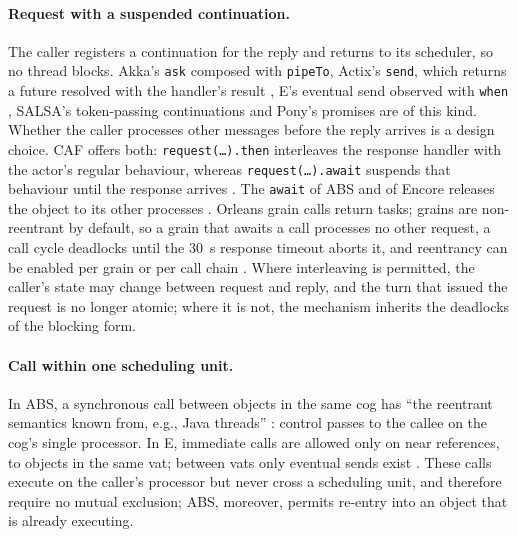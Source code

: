 \documentclass[11pt]{article}
\theoremstyle{definition}
\theoremstyle{remark}
\begin{document}
\paragraph{Request with a suspended continuation.} The caller registers a continuation for
the reply and returns to its scheduler, so no thread blocks. Akka's \texttt{ask} composed
with \texttt{pipeTo}, Actix's \texttt{send}, which returns a future resolved with the
handler's result \cite{actix}, E's eventual send observed with \texttt{when}
\cite{miller2005}, SALSA's token-passing continuations \cite{varela2001salsa} and Pony's
promises \cite{clebsch2015pony} are of this kind. Whether the caller processes other
messages before the reply arrives is a design choice. CAF offers both:
\texttt{request(\ldots).then} interleaves the response handler with the actor's regular
behaviour, whereas \texttt{request(\ldots).await} suspends that behaviour until the
response arrives \cite{charousset2016caf}. The \texttt{await} of ABS and of Encore
releases the object to its other processes \cite{johnsen2012abs,brandauer2015encore}.
Orleans grain calls return tasks; grains are non-reentrant by default, so a grain that
awaits a call processes no other request, a call cycle deadlocks until the 30~s response
timeout aborts it, and reentrancy can be enabled per grain or per call chain
\cite{bykov2011orleans,orleansreentrancy}. Where interleaving is permitted, the caller's
state may change between request and reply, and the turn that issued the request is no
longer atomic; where it is not, the mechanism inherits the deadlocks of the blocking form.

\paragraph{Call within one scheduling unit.} In ABS, a synchronous call between objects
in the same cog has ``the reentrant semantics known from, e.g., Java threads''
\cite{johnsen2012abs}: control passes to the callee on the cog's single processor. In E,
immediate calls are allowed only on near references, to objects in the same vat; between
vats only eventual sends exist \cite{miller2005}. These calls execute on the caller's
processor but never cross a scheduling unit, and therefore require no mutual exclusion;
ABS, moreover, permits re-entry into an object that is already executing.
\end{document}
